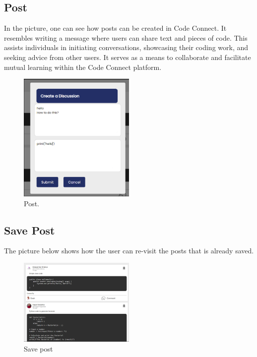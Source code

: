 \subsection{Post}
In the picture, one can see how posts can be created in Code Connect. It resembles writing a message where users can share text and pieces of code. This assists individuals in initiating conversations, showcasing their coding work, and seeking advice from other users. It serves as a means to collaborate and facilitate mutual learning within the Code Connect platform.
\begin{figure}[H]
    \centering
    \includegraphics[width=0.5\textwidth]{Outcome-ss/post.png}
    \caption{Post.}
    \label{fig:Post}
\end{figure}

\subsection{Save Post}
The picture below shows how the user can re-visit the posts that is already saved.
\begin{figure}[H]
    \centering
    \includegraphics[width=0.5\textwidth]{Outcome-ss/saved-posts-list.png}
    \caption{Save post}
    \label{fig:Save Post}
\end{figure}

